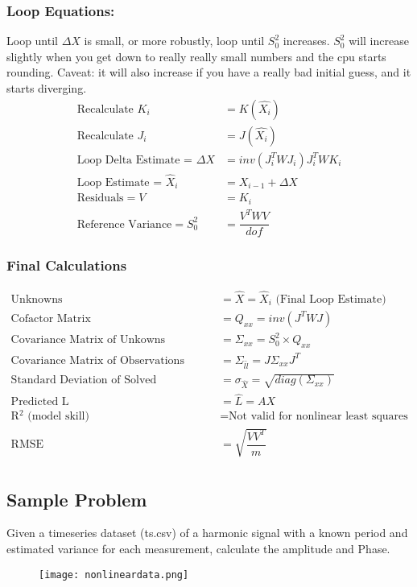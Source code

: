 \subsubsection{Loop Equations:}
Loop until $\Delta X $ is small, or more robustly, loop until $S_0^2$ increases.  $S_0^2$ will increase slightly when you get down to really really small numbers and the cpu starts rounding.  Caveat: it will also increase if you have a really bad initial guess, and it starts diverging.
\vspace{0.15cm}
\begin{align*}
\text{Recalculate } K_i & = K(\hat{X_i})\\
\text{Recalculate } J_i & = J(\hat{X_i})\\
\text{Loop Delta Estimate = }\Delta X &= inv(J_i^TWJ_i)J_i^TWK_i \\
\text{Loop Estimate = } \hat{X}_i &= X_{i-1}+\Delta X \\
\text{Residuals} = V &= K_i \\
\text{Reference Variance} = S_0^2 &= \dfrac{V^TWV}{dof}
\end{align*}
	
\subsubsection{Final Calculations}
\begin{align*}
	\text{Unknowns} &= \hat{X} = \hat{X}_i \text{   (Final Loop Estimate)}\\
	\text{Cofactor Matrix} &= Q_{xx} = inv(J^TWJ) \\
	\text{Covariance Matrix of Unkowns} &= \Sigma_{xx} = S_0^2 \times Q_{xx} \\
	\text{Covariance Matrix of Observations} &= \Sigma_{\hat{l}\hat{l}} = J \Sigma_{xx} J^T \\
	\text{Standard Deviation of Solved Unknowns} &= \sigma_{\hat{X}} = \sqrt{diag(\Sigma_{xx})} \\
	\text{Predicted L} &= \hat{L} = AX \\
	\text{R$^2$ (model skill)} &= \text{Not valid for nonlinear least squares} \\
	\text{RMSE } &= \sqrt{\dfrac{VV^T}{m}} \\
\end{align*}
\clearpage
\subsection{Sample Problem}

Given a timeseries dataset (ts.csv) of a harmonic signal with a known period and estimated variance for each measurement, calculate the amplitude and Phase.
\begin{figure}[H]
	\centering
	\texttt{[image: nonlineardata.png]}
\end{figure}

